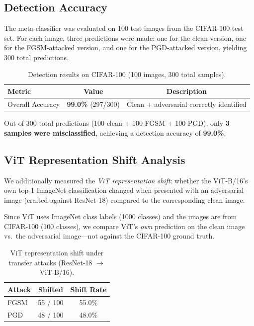 \documentclass[12pt, a4paper]{article}
\begin{document}
\subsection{Detection Accuracy}

The meta-classifier was evaluated on 100 test images from the CIFAR-100
test set.  For each image, three predictions were made: one for the
clean version, one for the FGSM-attacked version, and one for the
PGD-attacked version, yielding 300 total predictions.

\begin{table}[H]
\centering
\caption{Detection results on CIFAR-100 (100 images, 300 total samples).}
\label{tab:results}
\begin{tabular}{@{}lcc@{}}
\toprule
\textbf{Metric} & \textbf{Value} & \textbf{Description} \\
\midrule
Overall Accuracy & \textbf{99.0\%} (297/300)
    & Clean + adversarial correctly identified \\
\bottomrule
\end{tabular}
\end{table}

Out of 300 total predictions (100 clean + 100 FGSM + 100 PGD), only
\textbf{3 samples were misclassified}, achieving a detection accuracy of
\textbf{99.0\%}.

\subsection{ViT Representation Shift Analysis}

We additionally measured the \emph{ViT representation shift}: whether the
ViT-B/16's own top-1 ImageNet classification changed when presented with
an adversarial image (crafted against ResNet-18) compared to the
corresponding clean image.

Since ViT uses ImageNet class labels (1000 classes) and the images are
from CIFAR-100 (100 classes), we compare ViT's \emph{own} prediction on
the clean image vs.\ the adversarial image---not against the CIFAR-100
ground truth.

\begin{table}[H]
\centering
\caption{ViT representation shift under transfer attacks (ResNet-18
$\rightarrow$ ViT-B/16).}
\label{tab:vit_shift}
\begin{tabular}{@{}lcc@{}}
\toprule
\textbf{Attack} & \textbf{Shifted} & \textbf{Shift Rate} \\
\midrule
FGSM & 55 / 100 & 55.0\% \\
PGD  & 48 / 100 & 48.0\% \\
\bottomrule
\end{tabular}
\end{table}
\end{document}
